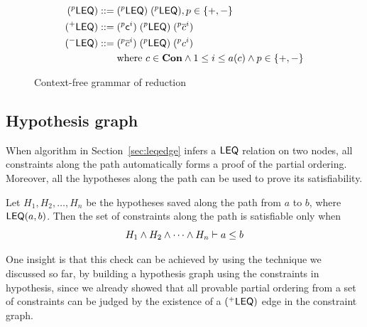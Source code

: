 \begin{figure}
\hfil
\begin{minipage}{2.3in}
\begin{align*}
(^{p}\mathsf{LEQ}) ::=\; & (^{p}\mathsf{LEQ})\; (^{p}\mathsf{LEQ}), p\in \{+,-\} \\
(^{+}\mathsf{LEQ}) ::=\; & (^{p}\textsf{c}^{i})\; (^{p}\mathsf{LEQ})\;
(^{p}\overline{c}^{i}) \\
(^{-}\mathsf{LEQ}) ::=\; & (^{p}\overline{c}^{i})\;
(^{p}\mathsf{LEQ})\; (^{p}c^{i}) \\
     & \text{where } c\in \mathbf{Con} \land 1 \leq i\leq a(c) \land p\in \{+,-\}
\end{align*}
\end{minipage}
\caption{Context-free grammar of reduction}
\label{figure:cfg}
\end{figure}

% 
\subsection{Hypothesis graph}
\label{sec:hypograph}

When algorithm in Section~\ref{sec:leqedge} infers a $\mathsf{LEQ}$ relation
on two nodes, all constraints along the path automatically forms a
proof of the partial ordering. Moreover, all the hypotheses along the
path can be used to prove its satisfiability.

Let $H_1, H_2, \dots, H_n$ be the hypotheses saved along the path from $a$ to
$b$, where $\mathsf{LEQ}(a,b)$. Then the set of constraints along the path is
satisfiable only when
\[H_1 \land H_2 \land \dots \land H_n \vdash a \leq b\]

One insight is that this check can be achieved by using the technique
we discussed so far, by building a hypothesis graph using the
constraints in hypothesis, since we already showed that all provable
partial ordering from a set of constraints can be judged by the
existence of a $(^{+}\mathsf{LEQ})$ edge in the constraint graph.


